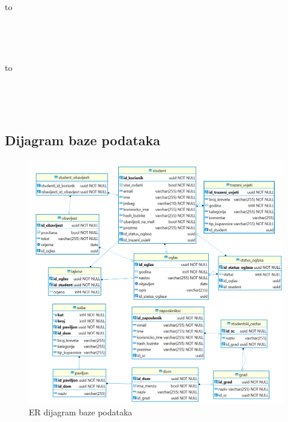 				\begin{longtabu} to \textwidth {|X[6, 2]|X[6, 2]|X[20, l]|}
					
					\hline {}	 \\[3pt] \hline
					\endfirsthead
					
					\hline {}	 \\[3pt] \hline
					\endhead
					
					\hline 
					\endlastfoot
					
					
					
				\end{longtabu}
			
				\begin{longtabu} to \textwidth {|X[6, 2]|X[6, 2]|X[20, l]|}
					
					\hline {}	 \\[3pt] \hline
					\endfirsthead
					
					\hline {}	 \\[3pt] \hline
					\endhead
					
					\hline 
					\endlastfoot
					
					
					
					
				\end{longtabu}
		
		
			
			
			\subsection{Dijagram baze podataka}
				\begin{figure}[H]
					\includegraphics[scale=0.4]{dijagrami/ERdijagram.png} %
					\centering
					\caption{ER dijagram baze podataka}
					\label{fig:er}
				\end{figure}
			
